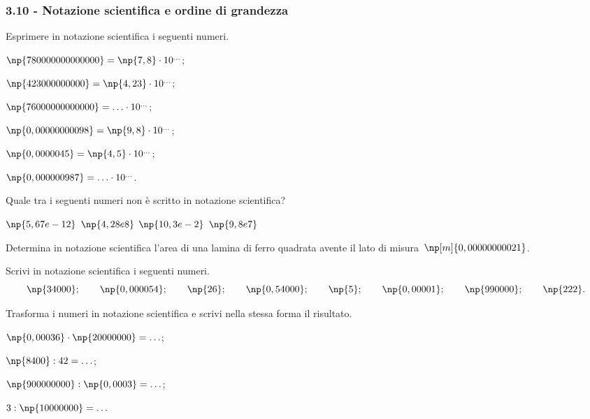 \subsubsection*{3.10 - Notazione scientifica e ordine di grandezza}

\begin{esercizio}
 \label{ese:3.67}
Esprimere in notazione scientifica i seguenti numeri.
\begin{multicols}{2}
\begin{enumeratea}
\item $\np{780000000000000}=\np{7,8}\cdot10^{\ldots}$;
\item $\np{423000000000}=\np{4,23}\cdot10^{\ldots}$;
\item $\np{76000000000000}= \ldots \cdot 10^{\ldots}$;
\item $\np{0,00000000098}=\np{9,8}\cdot10^{\ldots}$;
\item $\np{0,0000045}=\np{4,5}\cdot10^{\ldots}$;
\item $\np{0,000000987}= \ldots \cdot 10^{\ldots}$.
\end{enumeratea}
\end{multicols}
\end{esercizio}

\begin{esercizio}
 \label{ese:3.68}
Quale tra i seguenti numeri non è scritto in notazione scientifica?

\boxA\quad$\np{5,67e-12}$\qquad
\boxB\quad$\np{4,28e8}$\qquad
\boxC\quad$\np{10,3e-2}$\qquad
\boxD\quad$\np{9,8e7}$\qquad
\end{esercizio}

\begin{esercizio}
 \label{ese:3.69}
Determina in notazione scientifica l'area di una lamina di ferro quadrata
avente il lato di misura~$\np[m]{0,00000000021}$.
\end{esercizio}

\begin{esercizio}
 \label{ese:3.70}
Scrivi in notazione scientifica i seguenti numeri.
\[\np{34000};\qquad\np{0,000054};\qquad\np{26};\qquad\np{0,54000};\qquad\np{5};\qquad\np{0,00001};\qquad\np{990000};\qquad\np{222}.\]
\end{esercizio}
\pagebreak
\begin{esercizio}
 \label{ese:3.71}
Trasforma i numeri in notazione scientifica e scrivi nella stessa forma il risultato.
\begin{multicols}{2}
\begin{enumeratea}
\item $\np{0,00036}\cdot\np{20000000}=\ldots$;
\item $\np{8400}:42=\ldots$;
\item $\np{900000000}:\np{0,0003}=\ldots$;
\item $3:\np{10000000}=\ldots$
\end{enumeratea}
\end{multicols}
\end{esercizio}


